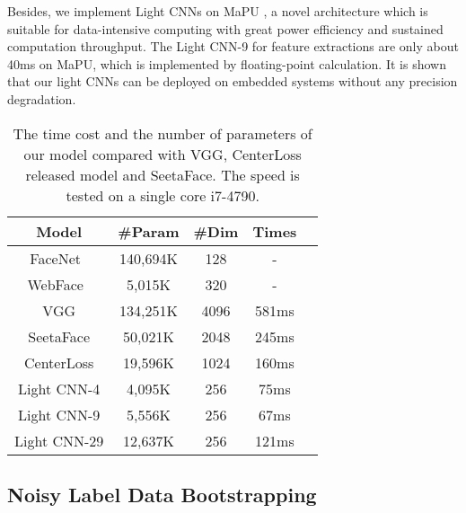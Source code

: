\documentclass[journal,transmag]{IEEEtran}
\begin{document}
Besides, we implement Light CNNs on MaPU \cite{DBLP:conf/hpca/WangDYLMRWWXWLW16}, a novel architecture which is suitable for data-intensive computing with great power efficiency and sustained computation throughput. The Light CNN-9 for feature extractions are only about 40ms on MaPU, which is implemented by floating-point calculation. It is shown that our light CNNs can be deployed on embedded systems without any precision degradation.


\begin{table}[t]
\centering
\caption{The time cost and the number of parameters of our model compared with VGG, CenterLoss released model and SeetaFace. The speed is tested on a single core i7-4790.}
\begin{tabular}{|c|c|c|c|c|}
\hline
Model & \#Param & \#Dim & Times \\
\hline
FaceNet~\cite{schroff2015facenet} & 140,694K& 128 & - \\
WebFace~\cite{yi2014learning} & 5,015K & 320& -\\
VGG \cite{parkhi2015deep} & 134,251K & 4096&  581ms   \\
SeetaFace \cite{liu2016viplfacenet} & 50,021K & 2048 & 245ms  \\
CenterLoss \cite{wen2016discriminative} & 19,596K & 1024 & 160ms  \\
\hline
Light CNN-4 & 4,095K & 256 & 75ms  \\
Light CNN-9 & 5,556K & 256 & 67ms  \\
Light CNN-29 & 12,637K & 256 & 121ms  \\
\hline
\end{tabular}
\label{tab:speed}
\end{table}




\subsection{Noisy Label Data Bootstrapping}\label{43}
\end{document}
